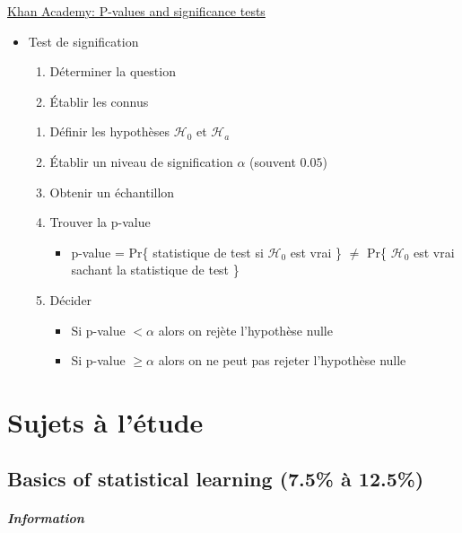 \documentclass[12pt, titlepage, french]{report}
\begin{document}
\begin{YTB_SUMM}{\href{https://www.youtube.com/watch?v=KS6KEWaoOOE}{Khan Academy: P-values and significance tests}}
\begin{itemize}
	\item	Test de signification
	\begin{enumerate}[label=\roman*]
		\item	Déterminer la question
		\item	Établir les connus
	\end{enumerate}
	\begin{enumerate}
		\item	Définir les hypothèses $\mathcal{H}_{0}$ et $\mathcal{H}_{a}$
		\item	Établir un niveau de signification $\alpha$ (souvent $0.05$)
		\item	Obtenir un échantillon
		\item	Trouver la p-value
		\begin{itemize}
			\item	p-value = Pr\{ statistique de test si $\mathcal{H}_{0}$ est vrai \} $\neq$  Pr\{ $\mathcal{H}_{0}$ est vrai sachant la statistique de test \}
		\end{itemize}
		\item	Décider
		\begin{itemize}
			\item	Si p-value $< \alpha$  alors on rejète l'hypothèse nulle
			\item	Si p-value $\geq \alpha$ alors on ne peut pas rejeter l'hypothèse nulle
		\end{itemize}
	\end{enumerate}
\end{itemize}
\end{YTB_SUMM}

\clearpage

\part*{Sujets à l'étude}

\chapter[Basics of statistical learning]{Basics of statistical learning (7.5\% à 12.5\%)}

\subsubsection{Information}
\end{document}
